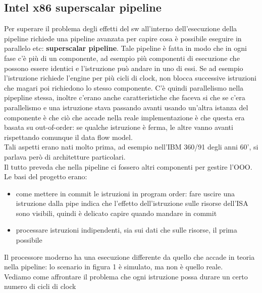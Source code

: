 \documentclass[14pt]{article}
\begin{document}
\subsection{Intel x86 superscalar pipeline}
Per superare il problema degli effetti del sw all'interno dell'esecuzione della pipeline richiede una  pipeline avanzata per capire cosa è possibile eseguire in parallelo etc: \textbf{superscalar pipeline}. Tale pipeline è fatta in modo che in ogni fase c'è più di un componente, ad esempio più componenti di esecuzione che possono essere identici e l'istruzione può andare in uno di essi. Se ad esempio l'istruzione richiede l'engine per più cicli di clock, non blocca successive istruzioni che magari poi richiedono lo stesso componente. C'è quindi parallelismo nella pipepline stessa, inoltre c'erano anche caratteristiche che faceva si che se c'era parallelismo e una istruzione stava passando avanti usando un'altra istanza del componente è che ciò che accade nella reale implementazione è che questa era basata su out-of-order: se qualche istruzione è ferma, le altre vanno avanti rispettando comunque il data flow model.\\ Tali aspetti erano nati molto prima, ad esempio nell'IBM 360/91 degli anni 60', si parlava però di architetture particolari.\\ Il tutto preveda che nella pipeline ci fossero altri componenti per gestire l'OOO.\\ Le basi del progetto erano:
\begin{itemize}
\item come mettere in commit le istruzioni in program order: fare uscire una istruzione dalla pipe indica che l'effetto dell'istruzione sulle risorse dell'ISA sono visibili, quindi è delicato capire quando mandare in commit
\item processare istruzioni indipendenti, sia sui dati che sulle risorse, il prima possibile
\end{itemize}
Il processore moderno ha una esecuzione differente da quello che accade in teoria nella pipeline: lo scenario in figura 1 è simulato, ma non è quello reale.\\ Vediamo come affrontare il problema che ogni istruzione possa durare un certo numero di cicli di clock
\end{document}
